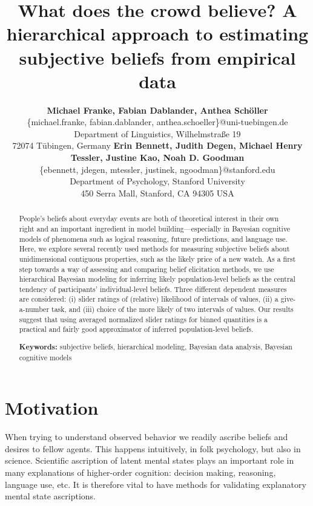 \documentclass[10pt,letterpaper]{article}
\title{What does the crowd believe? A hierarchical approach to estimating subjective beliefs
  from empirical data}
\author{{\large \bf Michael Franke, Fabian Dablander, Anthea Sch\"{o}ller} \\
  \{michael.franke, fabian.dablander, anthea.schoeller\}@uni-tuebingen.de \\
  Department of Linguistics, Wilhelmstra\ss e 19 \\
  72074 T\"{u}bingen, Germany \AND
  {\large \bf Erin Bennett, Judith Degen, Michael Henry Tessler, Justine Kao, Noah D. Goodman}\\
  \{ebennett, jdegen, mtessler, justinek, ngoodman\}@stanford.edu \\
  Department of Psychology, Stanford University \\
  450 Serra Mall, Stanford, CA 94305 USA }
\begin{document}
\maketitle

\begin{abstract}
  People's beliefs about everyday events are both of theoretical interest in their own right
  and an important ingredient in model building---especially in Bayesian cognitive models of
  phenomena such as logical reasoning, future predictions, and language use. Here, we explore
  several recently used methods for measuring subjective beliefs about unidimensional
  contiguous properties, such as the likely price of a new watch. As a first step towards a way
  of assessing and comparing belief elicitation methods, we use hierarchical Bayesian modeling
  for inferring likely population-level beliefs as the central tendency of participants'
  individual-level beliefs. Three different dependent measures are considered: (i) slider
  ratings of (relative) likelihood of intervals of values, (ii) a give-a-number task, and (iii)
  choice of the more likely of two intervals of values. Our results suggest that using averaged
  normalized slider ratings for binned quantities is a practical and fairly good approximator
  of inferred population-level beliefs.

  \textbf{Keywords:} subjective beliefs, hierarchical modeling, Bayesian data analysis,
  Bayesian cognitive models
\end{abstract}




\section{Motivation}

When trying to understand observed behavior we readily ascribe beliefs and desires to fellow
agents. This happens intuitively, in folk psychology, but also in science. Scientific
ascription of latent mental states plays an important role in many explanations of higher-order
cognition: decision making, reasoning, language use, etc. It is therefore vital to have methods
for validating explanatory mental state ascriptions.
\end{document}
